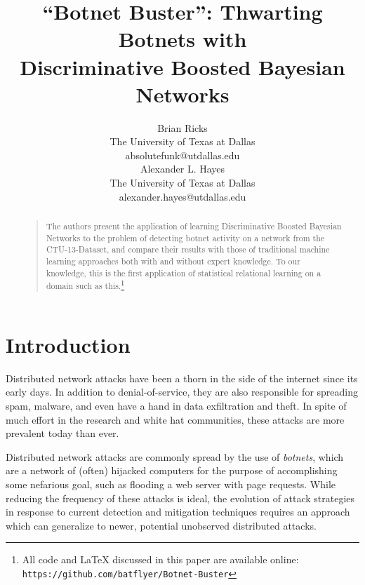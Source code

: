 \documentclass[letterpaper]{article}
\begin{document}
%
\title{``Botnet Buster'': Thwarting Botnets with\\Discriminative Boosted Bayesian Networks}

\author{Brian Ricks\\
The University of Texas at Dallas\\
absolutefunk@utdallas.edu\\
\And
Alexander L. Hayes\\
The University of Texas at Dallas\\
alexander.hayes@utdallas.edu
}

\maketitle
\begin{abstract}
\begin{quote}
The authors present the application of learning Discriminative Boosted Bayesian Networks to the problem of detecting botnet activity on a network from the CTU-13-Dataset, and compare their results with those of traditional machine learning approaches both with and without expert knowledge. To our knowledge, this is the first application of statistical relational learning on a domain such as this.\footnote{All code and \LaTeX{} discussed in this paper are available online:  \texttt{https://github.com/batflyer/Botnet-Buster}}
\end{quote}
\end{abstract}

\section{Introduction}
Distributed network attacks have been a thorn in the side of the internet since its early days.  In addition to denial-of-service, they are also responsible for spreading spam, malware, and even have a hand in data exfiltration and theft.  In spite of much effort in the research and white hat communities, these attacks are more prevalent today than ever.

Distributed network attacks are commonly spread by the use of \emph{botnets}, which are a network of (often) hijacked computers for the purpose of accomplishing some nefarious goal, such as flooding a web server with page requests.  While reducing the frequency of these attacks is ideal, the evolution of attack strategies in response to current detection and mitigation techniques requires an approach which can generalize to newer, potential unobserved distributed attacks.
\end{document}
